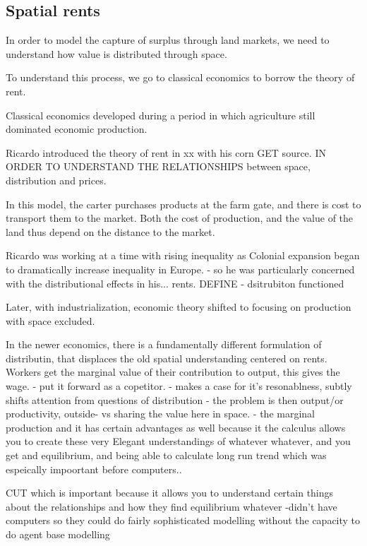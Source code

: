 \documentclass[]{article}
\begin{document}
\subsection{Spatial rents}
In order to model the capture of surplus through land markets, we need to understand how value is distributed through space.

To understand this process, we go to classical economics to borrow the theory of rent.   

Classical economics developed during a period in which agriculture still dominated economic production.

Ricardo introduced the theory of rent in xx with his corn GET source.  IN ORDER TO UNDERSTAND THE RELATIONSHIPS between space, distribution and prices.

In this model, the carter purchases products at the farm gate, and there is cost to transport them to the market. Both the cost of production, and the value of the land thus depend on the distance to the market.  

Ricardo was working at a time with rising inequality as Colonial expansion began to dramatically increase inequality in Europe. - so he was particularly concerned with the distributional effects in his...  rents. DEFINE - dsitrubiton functioned

Later, with industrialization, economic theory shifted to focusing on production with space excluded.

In the newer economics, there is a fundamentally different formulation of distributin, that displaces the old spatial understanding centered on rents. 
Workers get the marginal value of their contribution to output, this gives the wage. 
- put it forward as a copetitor.
- makes a case for it's resonablness, subtly shifts attention from questions of distribution - the problem is then output/or productivity, outside- vs sharing the value here in space. 
- the marginal production and it has certain advantages as well because it the calculus allows you to create these very Elegant understandings of whatever whatever, and you get and equilibrium, and being able to calculate long run trend  which was espeically impoortant before computers.. 

CUT which is important because it allows you to understand certain things about the relationships and how they find equilibrium whatever
-didn’t have computers so they could do fairly sophisticated modelling without the capacity to do agent base modelling 
\end{document}
